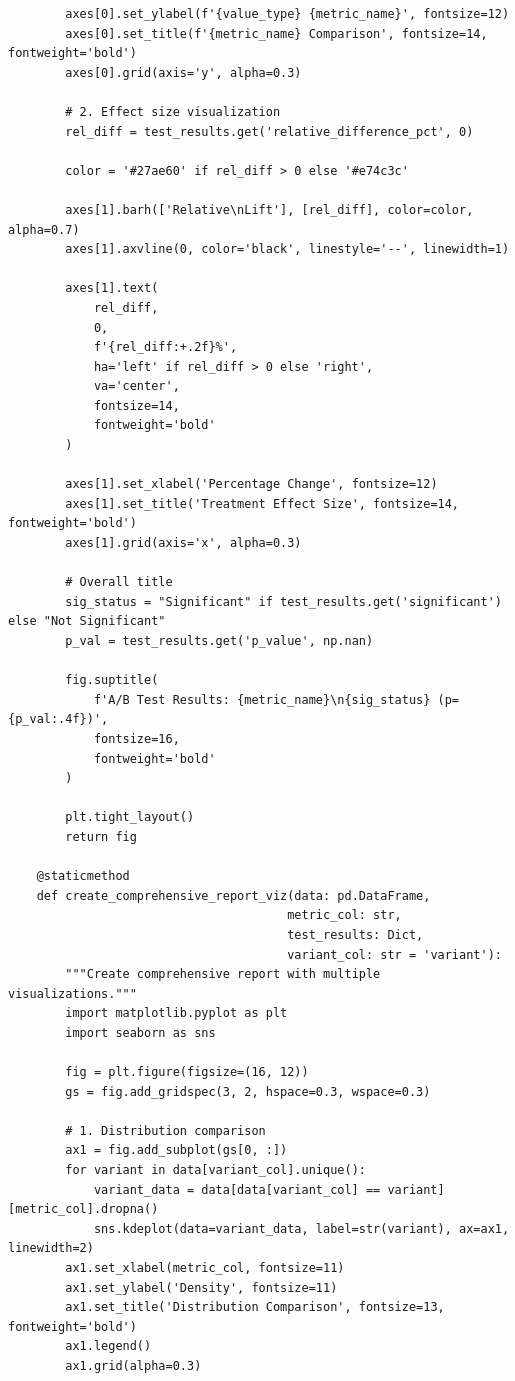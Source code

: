 \begin{lstlisting}
        axes[0].set_ylabel(f'{value_type} {metric_name}', fontsize=12)
        axes[0].set_title(f'{metric_name} Comparison', fontsize=14, fontweight='bold')
        axes[0].grid(axis='y', alpha=0.3)

        # 2. Effect size visualization
        rel_diff = test_results.get('relative_difference_pct', 0)

        color = '#27ae60' if rel_diff > 0 else '#e74c3c'

        axes[1].barh(['Relative\nLift'], [rel_diff], color=color, alpha=0.7)
        axes[1].axvline(0, color='black', linestyle='--', linewidth=1)

        axes[1].text(
            rel_diff,
            0,
            f'{rel_diff:+.2f}%',
            ha='left' if rel_diff > 0 else 'right',
            va='center',
            fontsize=14,
            fontweight='bold'
        )

        axes[1].set_xlabel('Percentage Change', fontsize=12)
        axes[1].set_title('Treatment Effect Size', fontsize=14, fontweight='bold')
        axes[1].grid(axis='x', alpha=0.3)

        # Overall title
        sig_status = "Significant" if test_results.get('significant') else "Not Significant"
        p_val = test_results.get('p_value', np.nan)

        fig.suptitle(
            f'A/B Test Results: {metric_name}\n{sig_status} (p={p_val:.4f})',
            fontsize=16,
            fontweight='bold'
        )

        plt.tight_layout()
        return fig

    @staticmethod
    def create_comprehensive_report_viz(data: pd.DataFrame,
                                       metric_col: str,
                                       test_results: Dict,
                                       variant_col: str = 'variant'):
        """Create comprehensive report with multiple visualizations."""
        import matplotlib.pyplot as plt
        import seaborn as sns

        fig = plt.figure(figsize=(16, 12))
        gs = fig.add_gridspec(3, 2, hspace=0.3, wspace=0.3)

        # 1. Distribution comparison
        ax1 = fig.add_subplot(gs[0, :])
        for variant in data[variant_col].unique():
            variant_data = data[data[variant_col] == variant][metric_col].dropna()
            sns.kdeplot(data=variant_data, label=str(variant), ax=ax1, linewidth=2)
        ax1.set_xlabel(metric_col, fontsize=11)
        ax1.set_ylabel('Density', fontsize=11)
        ax1.set_title('Distribution Comparison', fontsize=13, fontweight='bold')
        ax1.legend()
        ax1.grid(alpha=0.3)


\end{lstlisting}
